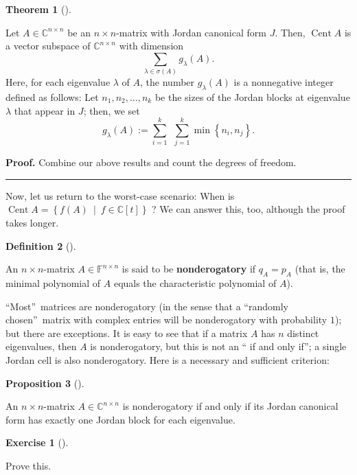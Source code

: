 \documentclass[numbers=enddot,12pt,final,onecolumn,notitlepage]{scrartcl}%
\newcounter{exer}
\numberwithin{exer}{subsection}
\theoremstyle{definition}
\newtheorem{theo}{Theorem}[subsection]
\newenvironment{theorem}[1][]
{\begin{theo}[#1]\begin{leftbar}}
{\end{leftbar}\end{theo}}
\newtheorem{prop}[theo]{Proposition}
\newenvironment{proposition}[1][]
{\begin{prop}[#1]\begin{leftbar}}
{\end{leftbar}\end{prop}}
\newtheorem{defi}[theo]{Definition}
\newenvironment{definition}[1][]
{\begin{defi}[#1]\begin{leftbar}}
{\end{leftbar}\end{defi}}
\newtheorem{exmp}[exer]{Exercise}
\newenvironment{exercise}[1][]
{\begin{exmp}[#1]\begin{leftbar}}
{\end{leftbar}\end{exmp}}
\newenvironment{proof}[1][Proof]{\noindent\textbf{#1.} }{\ \rule{0.5em}{0.5em}}
\let\sumnonlimits\sum
\renewcommand{\sum}{\sumnonlimits\limits}
\begin{document}
\begin{theorem}
Let $A\in\mathbb{C}^{n\times n}$ be an $n\times n$-matrix with Jordan
canonical form $J$. Then, $\operatorname*{Cent}A$ is a vector subspace of
$\mathbb{C}^{n\times n}$ with dimension%
\[
\sum_{\lambda\in\sigma\left(  A\right)  }g_{\lambda}\left(  A\right)  .
\]
Here, for each eigenvalue $\lambda$ of $A$, the number $g_{\lambda}\left(
A\right)  $ is a nonnegative integer defined as follows: Let $n_{1}%
,n_{2},\ldots,n_{k}$ be the sizes of the Jordan blocks at eigenvalue $\lambda$
that appear in $J$; then, we set%
\[
g_{\lambda}\left(  A\right)  :=\sum_{i=1}^{k}\ \ \sum_{j=1}^{k}\min\left\{
n_{i},n_{j}\right\}  .
\]

\end{theorem}

\begin{proof}
Combine our above results and count the degrees of freedom.
\end{proof}

Now, let us return to the worst-case scenario: When is $\operatorname*{Cent}%
A=\left\{  f\left(  A\right)  \ \mid\ f\in\mathbb{C}\left[  t\right]
\right\}  $ ? We can answer this, too, although the proof takes longer.

\begin{definition}
An $n\times n$-matrix $A\in\mathbb{F}^{n\times n}$ is said to be
\textbf{nonderogatory} if $q_{A}=p_{A}$ (that is, the minimal polynomial of
$A$ equals the characteristic polynomial of $A$).
\end{definition}

\textquotedblleft Most\textquotedblright\ matrices are nonderogatory (in the
sense that a \textquotedblleft randomly chosen\textquotedblright\ matrix with
complex entries will be nonderogatory with probability $1$); but there are
exceptions. It is easy to see that if a matrix $A$ has $n$ distinct
eigenvalues, then $A$ is nonderogatory, but this is not an \textquotedblleft
if and only if\textquotedblright; a single Jordan cell is also nonderogatory.
Here is a necessary and sufficient criterion:

\begin{proposition}
An $n\times n$-matrix $A\in\mathbb{C}^{n\times n}$ is nonderogatory if and
only if its Jordan canonical form has exactly one Jordan block for each eigenvalue.
\end{proposition}

\begin{exercise}
 Prove this.
\end{exercise}
\end{document}
